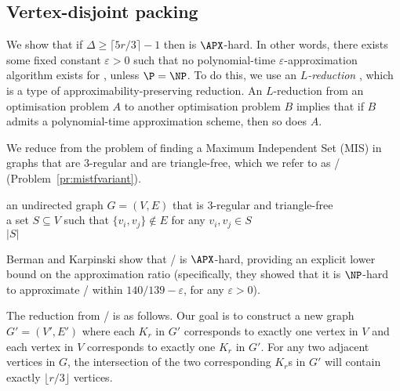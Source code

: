 \subsection{Vertex-disjoint packing} 

We show that if $\Delta \geq \lceil 5r/3 \rceil - 1$ then \vdkr is $\APX$-hard. In other words, there exists some fixed constant $\varepsilon > 0$ such that no polynomial-time $\varepsilon$-approximation algorithm exists for \vdkr, unless $\P=\NP$. To do this, we use an \emph{$L$-reduction} \cite{Crescenzi97}, which is a type of approximability-preserving reduction. An $L$-reduction from an optimisation problem $A$ to another optimisation problem $B$ implies that if $B$ admits a polynomial-time approximation scheme, then so does $A$.

We reduce from the problem of finding a Maximum Independent Set (MIS) in graphs that are $3$-regular and are triangle-free, which we refer to as \mistfvariant/ (Problem~\ref{pr:mistfvariant}).

\begin{myproblem}
\label{pr:mistfvariant}
\begin{samepage}
\begin{adjustwidth}{8pt}{8pt}
\instance an undirected graph $G=(V, E)$ that is $3$-regular and triangle-free\\
\solution a set $S \subseteq V$ such that $\{ v_i, v_j \} \notin E$ for any $v_i, v_j \in S$\\
\measure $|S|$
\end{adjustwidth}
\end{samepage}
\end{myproblem}
Berman and Karpinski \cite{BK99} show that \mistfvariant/ is $\APX$-hard, providing an explicit lower bound on the approximation ratio (specifically, they showed that it is $\NP$-hard to approximate \mistfvariant/ within $140/139-\varepsilon$, for any $\varepsilon > 0$).

The reduction from \mistfvariant/ is as follows. Our goal is to construct a new graph $G'=(V', E')$ where each $K_r$ in $G'$ corresponds to exactly one vertex in $V$ and each vertex in $V$ corresponds to exactly one $K_r$ in $G'$. For any two adjacent vertices in $G$, the intersection of the two corresponding $K_r$s in $G'$ will contain exactly $\lfloor r/3 \rfloor$ vertices. 

